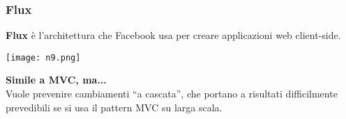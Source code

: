 \begin{frame}
\frametitle{Flux}
	\par
  	\textbf{Flux} è l’architettura che Facebook usa per creare applicazioni web client-side.\\
	\begin{flushleft}
		\texttt{[image: n9.png]}	
	\end{flushleft}	
	\textbf{Simile a MVC, ma...}\\
        Vuole prevenire cambiamenti “a cascata”, che portano a risultati difficilmente prevedibili se si usa il pattern MVC su larga scala.
\end{frame}


